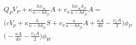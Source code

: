 \documentclass{article}
\begin{document}
    \begin{multline}
        Q_P V_P + \kappa \frac{h \phi_{\infty}} {\kappa - h \delta_{fi}} A + v_x  \frac{h \phi_{\infty} \delta_{fi}}{\kappa - h \delta_{fi}} A  =  \\
        \big( c V_p + \kappa  \frac{h}  {\kappa - h \delta_{fi}} S + v_x \frac{\kappa} {\kappa - h \delta_{fi}} A  + \frac{ \kappa A}{dx} - \frac{ v_x A}{2} \big) \phi_P  \\
        \big( - \frac{\kappa A}{dx} - \frac{v_x A}{2} \big) \phi_W
        \label{eq:stencilRobE}
    \end{multline}
  
\end{document}
